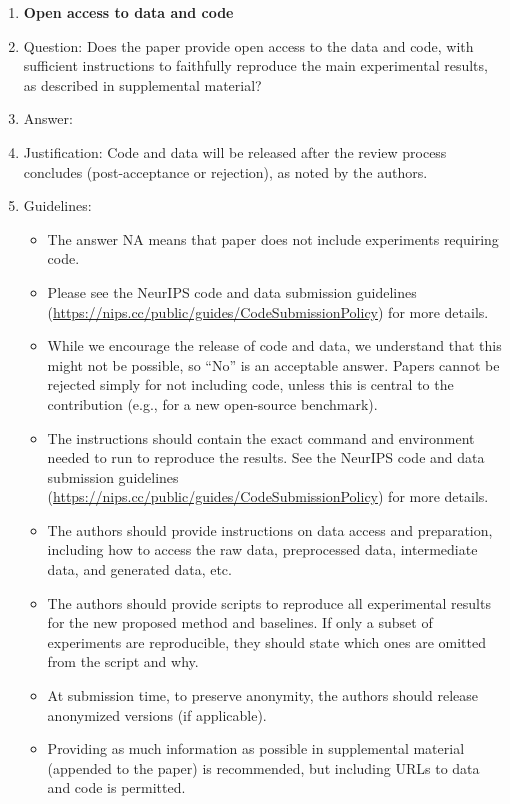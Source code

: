 \documentclass{article}
\theoremstyle{plain}
\theoremstyle{definition}
\theoremstyle{remark}
\begin{document}
{\begin{enumerate}
\item {\bf Open access to data and code}
    \item[] Question: Does the paper provide open access to the data and code, with sufficient instructions to faithfully reproduce the main experimental results, as described in supplemental material?
    \item[] Answer: \answerNo{}
    \item[] Justification: Code and data will be released after the review process concludes (post-acceptance or rejection), as noted by the authors.
    \item[] Guidelines:
    \begin{itemize}
        \item The answer NA means that paper does not include experiments requiring code.
        \item Please see the NeurIPS code and data submission guidelines (\url{https://nips.cc/public/guides/CodeSubmissionPolicy}) for more details.
        \item While we encourage the release of code and data, we understand that this might not be possible, so “No” is an acceptable answer. Papers cannot be rejected simply for not including code, unless this is central to the contribution (e.g., for a new open-source benchmark).
        \item The instructions should contain the exact command and environment needed to run to reproduce the results. See the NeurIPS code and data submission guidelines (\url{https://nips.cc/public/guides/CodeSubmissionPolicy}) for more details.
        \item The authors should provide instructions on data access and preparation, including how to access the raw data, preprocessed data, intermediate data, and generated data, etc.
        \item The authors should provide scripts to reproduce all experimental results for the new proposed method and baselines. If only a subset of experiments are reproducible, they should state which ones are omitted from the script and why.
        \item At submission time, to preserve anonymity, the authors should release anonymized versions (if applicable).
        \item Providing as much information as possible in supplemental material (appended to the paper) is recommended, but including URLs to data and code is permitted.
    \end{itemize}



\end{enumerate}}
\end{document}
